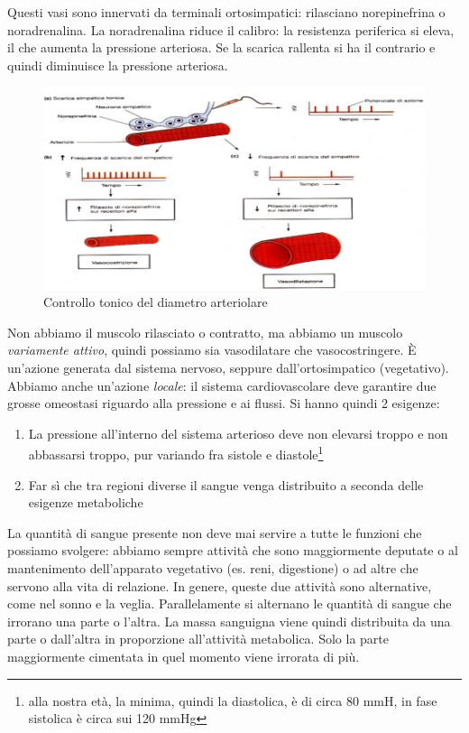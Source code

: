 \documentclass[a4paper,12pt]{article}
\begin{document}
Questi vasi sono innervati da terminali ortosimpatici: rilasciano norepinefrina o noradrenalina. La noradrenalina riduce il calibro: la resistenza periferica si eleva, il che aumenta la pressione arteriosa. Se la scarica rallenta si ha il contrario e quindi diminuisce la pressione arteriosa.
\begin{figure}[H]
\centering
\includegraphics[scale=0.5]{immagine/orto.jpg}
\caption{Controllo tonico del diametro arteriolare}
\end{figure}

Non abbiamo il muscolo rilasciato o contratto, ma abbiamo un muscolo \emph{variamente attivo}, quindi possiamo sia vasodilatare che vasocostringere. È un'azione generata dal sistema nervoso, seppure dall'ortosimpatico (vegetativo). Abbiamo anche un'azione \emph{locale}: il sistema cardiovascolare deve garantire due grosse omeostasi riguardo alla pressione e ai flussi. Si hanno quindi 2 esigenze:
\begin{enumerate}
\item{La pressione all'interno del sistema arterioso deve non elevarsi troppo e non abbassarsi troppo, pur variando fra sistole e diastole\footnote{alla nostra età, la minima, quindi la diastolica, è di circa 80 mmH, in fase sistolica è circa sui 120 mmHg}}
\item{Far sì che tra regioni diverse il sangue venga distribuito a seconda delle esigenze metaboliche}
\end{enumerate}

La quantità di sangue presente non deve mai servire a tutte le funzioni che possiamo svolgere: abbiamo sempre attività che sono maggiormente deputate o al mantenimento dell'apparato vegetativo (es. reni, digestione) o ad altre che servono alla vita di relazione. In genere, queste due attività sono alternative, come nel sonno e la veglia. Parallelamente si alternano le quantità di sangue che irrorano una parte o l'altra. La massa sanguigna viene quindi distribuita da una parte o dall'altra in proporzione all'attività metabolica. Solo la parte maggiormente cimentata in quel momento viene irrorata di più. 
\end{document}
